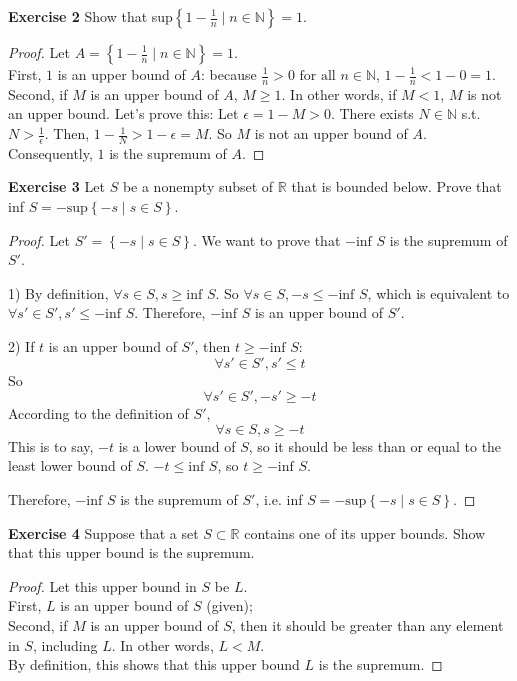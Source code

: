 \documentclass[12pt]{article}
\newcommand{\bbN}{\mathbb{N}}
\newcommand{\bbR}{\mathbb{R}}
\theoremstyle{definition}
\numberwithin{equation}{subsection}
\begin{document}
\textbf{Exercise 2} Show that sup$\left\{1-\frac{1}{n}
\mid n \in \mathbb{N}\right\}=1$.
\begin{proof}
Let $A = \left\{1-\frac{1}{n}
\mid n \in \mathbb{N}\right\}=1$.\\
First, $1$ is an upper bound of $A$: because $\frac{1}{n} > 0 \text{ for all }
n \in \bbN$, $1-\frac{1}{n} < 1-0=1$. \\
Second, if $M$ is an upper bound of $A$, $M \geq 1$. In other words, if $M < 1$, $M$ is not an upper bound. Let's prove this: Let $\epsilon = 1 - M > 0$. There exists $N \in \bbN$ s.t. $N > \frac{1}{\epsilon}$. Then, $1-\frac{1}{N} > 1-\epsilon = M$. So $M$ is not an upper bound of $A$.\\
Consequently, $1$ is the supremum of $A$.
\end{proof}

\textbf{Exercise 3} Let $S$ be a nonempty subset of $\bbR$ that is bounded below. Prove that
\\inf $S=-\text{sup}\left\{-s \mid s \in S \right\}$.
\newcommand{\infS}{\text{inf } S}
\newcommand{\supS}{\text{sup } S'}
\begin{proof}
Let $S' = \left\{-s \mid s \in S \right\}$. We want to prove that $-\infS$ is the supremum of $S'$.

1) By definition, $\forall s \in S, s \geq \infS$. So $\forall s \in S, -s \leq -\infS$, which is equivalent to $\forall s' \in S', s' \leq -\infS$. Therefore, $-\infS$ is an upper bound of $S'$.

2) If $t$ is an upper bound of $S'$, then $t \geq -\infS$:
$$
\forall s' \in S', s' \leq t
$$
So
$$
\forall s' \in S', -s' \geq -t
$$
According to the definition of $S'$,
$$
\forall s \in S, s \geq -t
$$
This is to say, $-t$ is a lower bound of $S$, so it should be less than or equal to the least lower bound of $S$. $-t\leq \infS$, so $t \geq -\infS$.

Therefore, $-\infS$ is the supremum of $S'$, i.e. inf $S=-\text{sup}\left\{-s \mid s \in S \right\}$.
\end{proof}

\textbf{Exercise 4} Suppose that a set $S \subset \bbR$ contains one of
 its upper bounds. Show that this upper bound is the supremum.
\begin{proof}
Let this upper bound in $S$ be $L$.\\
First, $L$ is an upper bound of $S$ (given);\\
Second, if $M$ is an upper bound of $S$, then it should be greater than any
element in $S$, including $L$. In other words, $L < M$.\\
By definition, this shows that this upper bound $L$ is the supremum.
\end{proof}
\end{document}

